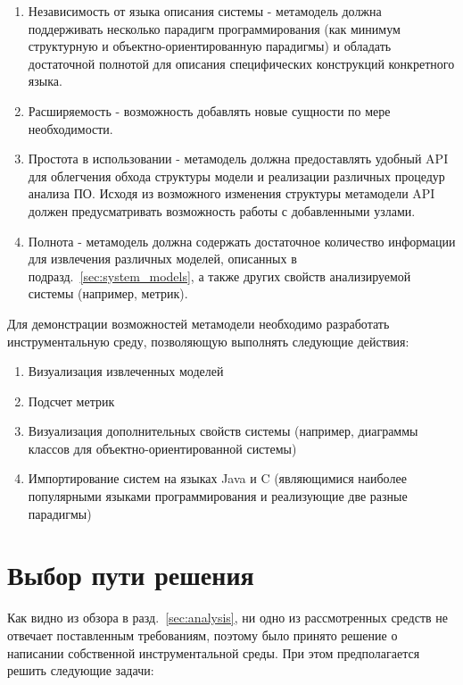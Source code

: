 \begin{enumerate}
    \item Независимость от языка описания системы - метамодель должна
    поддерживать несколько парадигм программирования (как минимум структурную и
    объектно-ориентированную парадигмы) и обладать достаточной полнотой для
    описания специфических конструкций конкретного языка.
    \item Расширяемость - возможность добавлять новые сущности по мере
    необходимости.
    \item Простота в использовании - метамодель должна предоставлять удобный API
    для облегчения обхода структуры модели и реализации различных процедур
    анализа ПО. Исходя из возможного изменения структуры метамодели API должен
    предусматривать возможность работы с добавленными узлами.
    \item Полнота - метамодель должна содержать достаточное количество
    информации для извлечения различных моделей, описанных в
    подразд.~\ref{sec:system_models}, а также других свойств анализируемой
    системы (например, метрик).
\end{enumerate}

Для демонстрации возможностей метамодели необходимо разработать инструментальную
среду, позволяющую выполнять следующие действия:

\begin{enumerate}
    \item Визуализация извлеченных моделей
    \item Подсчет метрик
    \item Визуализация дополнительных свойств системы (например, диаграммы
    классов для объектно-ориентированной системы)
    \item Импортирование систем на языках Java и C (являющимися наиболее
    популярными языками программирования и реализующие две разные парадигмы)
\end{enumerate}

\section{Выбор пути решения}
\label{sec:tasks}
Как видно из обзора в разд.~\ref{sec:analysis}, ни одно из рассмотренных средств
не отвечает поставленным требованиям, поэтому было принято решение о написании
собственной инструментальной среды. При этом предполагается решить следующие
задачи:

